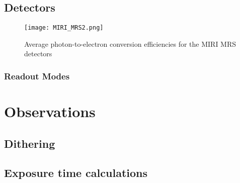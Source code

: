 \subsection{Detectors}
\begin{figure}[t]
	\texttt{[image: MIRI\_MRS2.png]}
	\caption{Average photon-to-electron conversion efficiencies for the MIRI MRS detectors}
	\label{fig:mirideteff}
\end{figure}
\subsubsection{Readout Modes}
\section{Observations}
\subsection{Dithering}
\subsection{Exposure time calculations}
